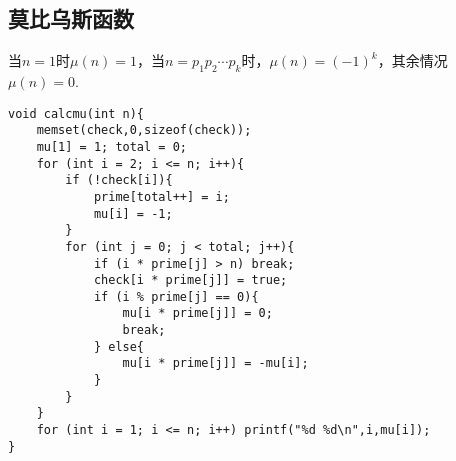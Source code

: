 \subsection{莫比乌斯函数}
当$n=1$时$\mu(n)=1$，当$n=p_1p_2\cdots p_k$时，$\mu(n)=(-1)^k$，其余情况$\mu(n)=0$.

\begin{verbatim}
void calcmu(int n){
    memset(check,0,sizeof(check));
    mu[1] = 1; total = 0;
    for (int i = 2; i <= n; i++){
        if (!check[i]){
            prime[total++] = i;
            mu[i] = -1;
        }
        for (int j = 0; j < total; j++){
            if (i * prime[j] > n) break;
            check[i * prime[j]] = true;
            if (i % prime[j] == 0){
                mu[i * prime[j]] = 0;
                break;
            } else{
                mu[i * prime[j]] = -mu[i];
            }
        }
    }
    for (int i = 1; i <= n; i++) printf("%d %d\n",i,mu[i]);
}
\end{verbatim}
